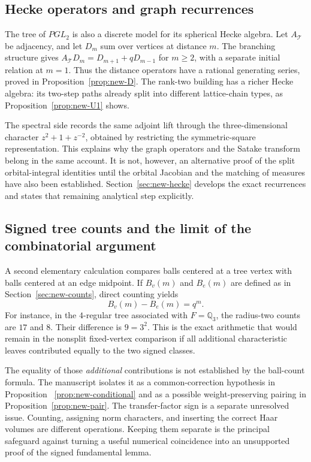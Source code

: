 \documentclass[12pt,letterpaper]{amsart}
\numberwithin{equation}{section}
\theoremstyle{definition}
\theoremstyle{plain}
\begin{document}
\subsection{Hecke operators and graph recurrences}
\label{sec:intro-hecke}

The tree of $PGL_2$ is also a discrete model for its spherical
Hecke algebra. Let $A_{\mathcal T}$ be adjacency, and let $D_m$
sum over vertices at distance $m$. The branching structure gives
$A_{\mathcal T}D_m=D_{m+1}+qD_{m-1}$ for $m\ge2$, with a
separate initial relation at $m=1$. Thus the distance operators
have a rational generating series, proved in
Proposition~\ref{prop:new-D}. The rank-two building has a richer
Hecke algebra: its two-step paths already split into different
lattice-chain types, as Proposition~\ref{prop:new-U1} shows.

The spectral side records the same adjoint lift through the
three-dimensional character $z^2+1+z^{-2}$, obtained by
restricting the symmetric-square representation. This explains
why the graph operators and the Satake transform belong in the
same account. It is not, however, an alternative proof of the
split orbital-integral identities until the orbital Jacobian
and the matching of measures have also been established.
Section~\ref{sec:new-hecke} develops the exact recurrences and
states that remaining analytical step explicitly.

\subsection{Signed tree counts and the limit of the combinatorial argument}
\label{sec:intro-counts}

A second elementary calculation compares balls centered at a tree
vertex with balls centered at an edge midpoint. If $B_v(m)$ and
$B_e(m)$ are defined as in Section~\ref{sec:new-counts}, direct
counting yields
\[
 B_v(m)-B_e(m)=q^m.
\]
For instance, in the $4$-regular tree associated with
$F=\mathbb Q_3$, the radius-two counts are $17$ and $8$.
Their difference is $9=3^2$. This is the exact arithmetic
that would remain in the nonsplit fixed-vertex comparison if
all additional characteristic leaves contributed equally to
the two signed classes.

The equality of those \emph{additional} contributions is not
established by the ball-count formula. The manuscript isolates
it as a common-correction hypothesis in Proposition~
\ref{prop:new-conditional} and as a possible weight-preserving
pairing in Proposition~\ref{prop:new-pair}. The transfer-factor
sign is a separate unresolved issue. Counting, assigning norm
characters, and inserting the correct Haar volumes are different
operations. Keeping them separate is the principal safeguard
against turning a useful numerical coincidence into an
unsupported proof of the signed fundamental lemma.
\end{document}
